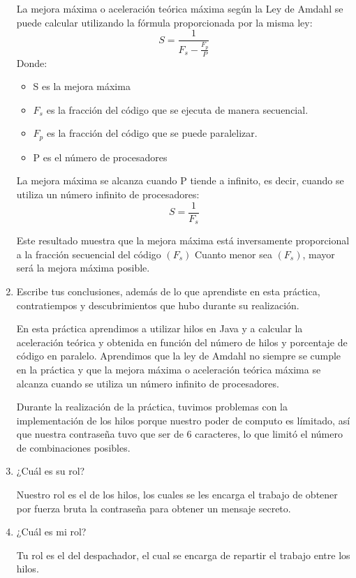 \documentclass{article}
\begin{document}
\begin{enumerate}
    La mejora máxima o aceleración teórica máxima según la Ley de Amdahl se puede calcular utilizando la fórmula proporcionada por la misma ley:
    \[S= \frac{1}{F_s-\frac{F_p}{P}}\]
    Donde:
    \begin{itemize}
        \item S es la mejora máxima
        \item $F_s$ es la fracción del código que se ejecuta de manera secuencial.
        \item $F_p$ es la fracción del código que se puede paralelizar.
        \item P es el número de procesadores
    \end{itemize}
    La mejora máxima se alcanza cuando P tiende a infinito, es decir, cuando se utiliza un número infinito de procesadores:
    \[S = \frac{1}{F_s}\]

    Este resultado muestra que la mejora máxima está inversamente proporcional a la fracción secuencial del código $(F_s)$ Cuanto menor sea $(F_s)$, mayor será la mejora máxima posible. 

    \item Escribe tus conclusiones, además de lo que aprendiste en esta práctica, contratiempos y descubrimientos que hubo durante su realización.
    
    En esta práctica aprendimos a utilizar hilos en Java y a calcular la aceleración teórica y obtenida en función del número de hilos y porcentaje de código en paralelo. Aprendimos que la ley de Amdahl no siempre se cumple en la práctica y que la mejora máxima o aceleración teórica máxima se alcanza cuando se utiliza un número infinito de procesadores. 

    Durante la realización de la práctica, tuvimos problemas con la implementación de los hilos porque nuestro poder de computo es límitado, así que nuestra contraseña tuvo que ser de 6 caracteres, lo que limitó el número de combinaciones posibles.
    
    \item ¿Cuál es su rol? 
    
    Nuestro rol es el de los hilos, los cuales se les encarga el trabajo de obtener por fuerza bruta la contraseña para obtener un mensaje secreto. 

    \item ¿Cuál es mi rol?
    
    Tu rol es el del despachador, el cual se encarga de repartir el trabajo entre los hilos.

    
\end{enumerate}
\end{document}
